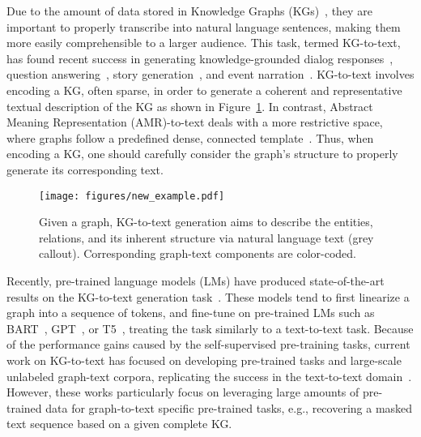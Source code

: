 \documentclass[11pt]{article}
\begin{document}
Due to the amount of data stored in Knowledge Graphs (KGs)~\cite{auer2007dbpedia,vrandevcic2014wikidata,bollacker2008freebase,yates2007textrunner,bodenreider2004unified,wishart2018drugbank}, they are important to properly transcribe into natural language sentences, making them more easily comprehensible to a larger audience. This task, termed KG-to-text, has found recent success in generating knowledge-grounded dialog responses~\cite{wen2016multi,zhou2018commonsense}, question answering~\cite{he2017generating, bhowmik2018generating,pal2019answering,agarwal-etal-2021-knowledge}, story generation~\cite{guan2019story,ji2020language}, and event narration~\cite{colas2021eventnarrative}. KG-to-text involves encoding a KG, often sparse, in order to generate a coherent and representative textual description of the KG as shown in Figure~\ref{fig:task}. In contrast, Abstract Meaning Representation (AMR)-to-text deals with a more restrictive space, where graphs follow a predefined dense, connected template~\cite{ribeiro-etal-2021-structural, koncel2019text}. Thus, when encoding a KG, one should carefully consider the graph's structure to properly generate its corresponding text.
\begin{figure}[t!]
\centering
\texttt{[image: figures/new\_example.pdf]}
\caption{Given a graph, KG-to-text generation aims to describe the entities, relations, and its inherent structure via natural language text (grey callout). Corresponding graph-text components are color-coded. }
\label{fig:task}
\end{figure}

Recently, pre-trained language models (LMs) have produced state-of-the-art results on the KG-to-text generation task~\cite{ribeiro2020investigating,chen-etal-2020-kgpt}. These models tend to first linearize a graph into a sequence of tokens, and fine-tune on pre-trained LMs such as BART~\cite{lewis2020bart}, GPT~\cite{radford2018improving,radford2019language}, or T5~\cite{raffel2020exploring}, treating the task similarly to a text-to-text task. Because of the performance gains caused by the self-supervised pre-training tasks, current work on KG-to-text has focused on developing pre-trained tasks and large-scale unlabeled graph-text corpora, replicating the success in the text-to-text domain~\cite{chen-etal-2020-kgpt,ke-etal-2021-jointgt}. However, these works particularly focus on leveraging large amounts of pre-trained data for graph-to-text specific pre-trained tasks, e.g., recovering a masked text sequence based on a given complete KG. 
\end{document}
